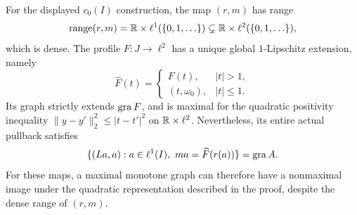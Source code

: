 \begin{corollary}\label{cor:dense-profile}
For the displayed $c_0(I)$ construction, the map $(r,m)$ has range
\begin{equation}
\operatorname{range}(r,m)=\mathbb R\times\ell^1(\{0,1,\ldots\})
\subsetneq\mathbb R\times\ell^2(\{0,1,\ldots\}),
\label{eq:cor-dense-range}
\end{equation}
which is dense. The profile $F:J\to\ell^2$ has a unique global
$1$-Lipschitz extension, namely
\begin{equation}
\widehat F(t)=
\begin{cases}
F(t),&|t|>1,\\
(t,\omega_0),&|t|\le1.
\end{cases}
\label{eq:cor-profile-extension}
\end{equation}
Its graph strictly extends $\operatorname{gra} F$, and is maximal for the quadratic
positivity inequality $\|y-y'\|_2^2\le|t-t'|^2$ on
$\mathbb R\times\ell^2$. Nevertheless, its entire actual pullback satisfies
\begin{equation}
\{(La,a):a\in\ell^1(I),\ ma=\widehat F(r(a))\}
=\operatorname{gra} A.
\label{eq:cor-same-pullback}
\end{equation}
For these maps, a maximal monotone graph can therefore have a nonmaximal
image under the quadratic representation described in the proof, despite
the dense range of $(r,m)$.
\end{corollary}
